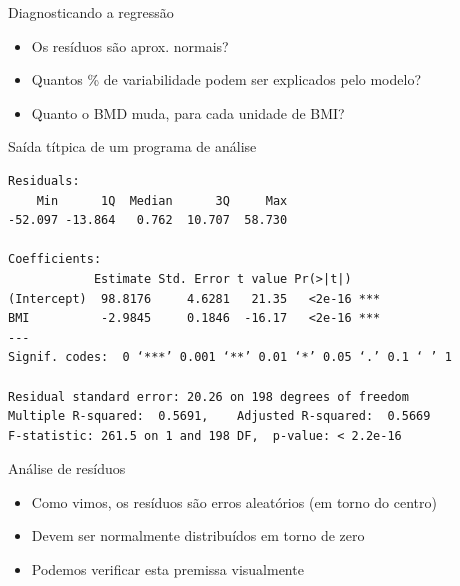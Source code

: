 \documentclass{beamer}
\begin{document}
\begin{frame}[fragile]{Diagnosticando a regressão}
  \begin{exampleblock}{}
    \begin{itemize}
    \item Os resíduos são aprox. normais?
    \item Quantos \% de variabilidade podem ser explicados pelo modelo?
    \item Quanto o BMD muda, para cada unidade de BMI?
    \end{itemize}
  \end{exampleblock}
  \begin{exampleblock}{Saída títpica de um programa de análise}
    \tiny
\begin{verbatim}
Residuals:
    Min      1Q  Median      3Q     Max 
-52.097 -13.864   0.762  10.707  58.730 

Coefficients:
            Estimate Std. Error t value Pr(>|t|)    
(Intercept)  98.8176     4.6281   21.35   <2e-16 ***
BMI          -2.9845     0.1846  -16.17   <2e-16 ***
---
Signif. codes:  0 ‘***’ 0.001 ‘**’ 0.01 ‘*’ 0.05 ‘.’ 0.1 ‘ ’ 1

Residual standard error: 20.26 on 198 degrees of freedom
Multiple R-squared:  0.5691,	Adjusted R-squared:  0.5669 
F-statistic: 261.5 on 1 and 198 DF,  p-value: < 2.2e-16
\end{verbatim}
\end{exampleblock}
\end{frame}

\begin{frame}{Análise de resíduos}
  \begin{itemize}
  \item Como vimos, os resíduos são erros aleatórios (em torno do centro)
    \bigskip
  \item Devem ser normalmente distribuídos em torno de zero
    \bigskip
  \item Podemos verificar esta premissa visualmente
  \end{itemize}
\end{frame}
\end{document}
